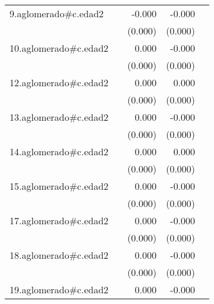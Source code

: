 {\begin{longtable}{l*{4}{D{.}{.}{-1}}}
\addlinespace
9.aglomerado#c.edad2&                     &      -0.000         &      -0.000\sym{**} &                     \\
            &                     &     (0.000)         &     (0.000)         &                     \\
\addlinespace
10.aglomerado#c.edad2&                     &       0.000         &      -0.000         &                     \\
            &                     &     (0.000)         &     (0.000)         &                     \\
\addlinespace
12.aglomerado#c.edad2&                     &       0.000\sym{*}  &       0.000         &                     \\
            &                     &     (0.000)         &     (0.000)         &                     \\
\addlinespace
13.aglomerado#c.edad2&                     &       0.000         &      -0.000         &                     \\
            &                     &     (0.000)         &     (0.000)         &                     \\
\addlinespace
14.aglomerado#c.edad2&                     &       0.000         &       0.000         &                     \\
            &                     &     (0.000)         &     (0.000)         &                     \\
\addlinespace
15.aglomerado#c.edad2&                     &       0.000         &      -0.000         &                     \\
            &                     &     (0.000)         &     (0.000)         &                     \\
\addlinespace
17.aglomerado#c.edad2&                     &       0.000         &      -0.000         &                     \\
            &                     &     (0.000)         &     (0.000)         &                     \\
\addlinespace
18.aglomerado#c.edad2&                     &       0.000         &      -0.000         &                     \\
            &                     &     (0.000)         &     (0.000)         &                     \\
\addlinespace
19.aglomerado#c.edad2&                     &       0.000         &      -0.000         &                     \\

\end{longtable}}
